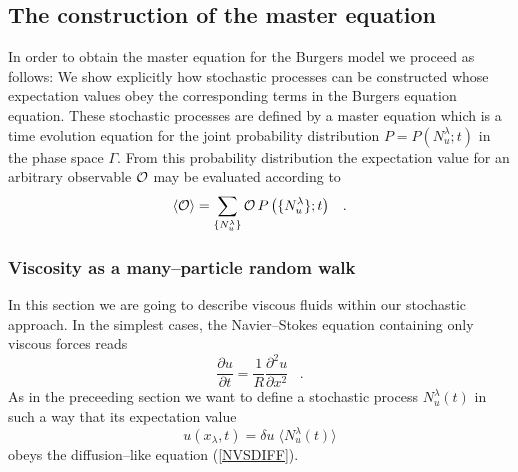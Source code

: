 \subsection{The construction of the master equation}

In order to obtain the master equation for the Burgers model  we proceed
as follows: We show explicitly how stochastic processes can be
constructed whose expectation values obey the corresponding
terms in the Burgers equation equation. These stochastic processes
are defined by a master equation which is a time evolution equation
for the joint probability distribution $P=P(N_u^{\lambda};t)$ in the
phase space $\Gamma$. From this probability distribution the
expectation
value for an arbitrary observable ${\cal{O}}$ may be evaluated
according to
\begin{equation}
\langle {\cal{O}} \rangle = \sum_{\left\{ N_u^{\lambda} \right\}}
{\cal{O}} \, P \left( \{ N_u^{\lambda} \} ;t \right) \;\;\; .
\end{equation}

\subsubsection{Viscosity as a many--particle random walk}
In this section we are going to describe viscous fluids within
our stochastic
approach. In the simplest cases, the Navier--Stokes equation
containing only
viscous forces reads
\begin{equation}
\label{NVSDIFF}
\frac{\partial u}{\partial t} =
   \frac{1}{R} \frac{\partial^2 u}{\partial x^2} \;\;\; .
\end{equation}
As in the preceeding section we want to define a stochastic process
$N_u^{\lambda}(t)$
in such a way that its expectation value
\begin{equation}            \label{EXP2}
u(x_{\lambda},t) = \delta u \; \langle N_u^{\lambda}(t) \rangle
\end{equation}
obeys the diffusion--like equation (\ref{NVSDIFF}).

